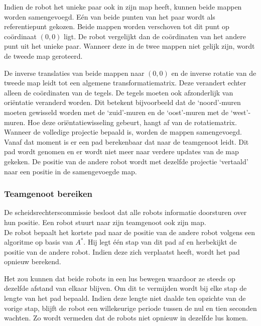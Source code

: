 \documentclass[eind]{penoverslag}
\begin{document}
Indien de robot het unieke paar ook in zijn map heeft, kunnen beide mappen worden samengevoegd. E\'en van beide punten van het paar wordt als referentiepunt gekozen. Beide mappen worden verschoven tot dit punt op co\"ordinaat $(0,0)$ ligt. De robot vergelijkt dan de co\"ordinaten van het andere punt uit het unieke paar. Wanneer deze in de twee mappen niet gelijk zijn, wordt de tweede map geroteerd.

De inverse translaties van beide mappen naar $(0,0)$ en de inverse rotatie van de tweede map leidt tot een algemene transformatiematrix. Deze verandert echter alleen de co\"ordinaten van de tegels. De tegels moeten ook afzonderlijk van ori\"entatie veranderd worden. Dit betekent bijvoorbeeld dat de `noord'-muren moeten gewisseld worden met de `zuid'-muren en de `oost'-muren met de `west'-muren. Hoe deze ori\"entatiewisseling gebeurt, hangt af van de rotatiematrix.\\

Wanneer de volledige projectie bepaald is, worden de mappen samengevoegd. Vanaf dat moment is er een pad berekenbaar dat naar de teamgenoot leidt. Dit pad wordt genomen en er wordt niet meer naar verdere updates van de map gekeken. De positie van de andere robot wordt met dezelfde projectie `vertaald' naar een positie in de samengevoegde map.

\subsubsection{Teamgenoot bereiken}
\label{sssec:AlgoTeam}

De scheidsrechterscommissie besloot dat alle robots informatie doorsturen over hun positie. Een robot stuurt naar zijn teamgenoot ook zijn map.\\

De robot bepaalt het kortste pad naar de positie van de andere robot volgens een algoritme op basis van $A^{*}$. Hij legt \'e\'en stap van dit pad af en herbekijkt de positie van de andere robot. Indien deze zich verplaatst heeft, wordt het pad opnieuw berekend.

Het zou kunnen dat beide robots in een lus bewegen waardoor ze steeds op dezelfde afstand van elkaar blijven. Om dit te vermijden wordt bij elke stap de lengte van het pad bepaald. Indien deze lengte niet daalde ten opzichte van de vorige stap, blijft de robot een willekeurige periode tussen de nul en tien seconden wachten. Zo wordt vermeden dat de robots niet opnieuw in dezelfde lus komen.
\end{document}
